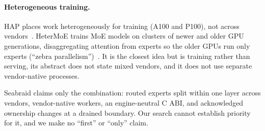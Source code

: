 \documentclass[11pt]{article}
\newcommand{\product}{Seabraid}                 %
\begin{document}
\paragraph{Heterogeneous training.} HAP places work heterogeneously for training (A100 and P100), not across
vendors~\cite{hap}. HeterMoE trains MoE models on clusters of newer and older GPU generations, disaggregating attention
from experts so the older GPUs run only experts (``zebra parallelism'')~\cite{hetermoe}. It is the closest idea but is
training rather than serving, its abstract does not state mixed vendors, and it does not use separate vendor-native
processes.

\product{} claims only the combination: routed experts split within one layer across
vendors, vendor-native workers, an engine-neutral C ABI, and acknowledged ownership changes at a drained boundary. Our search cannot establish priority for it, and we make no ``first'' or ``only'' claim.
\end{document}
